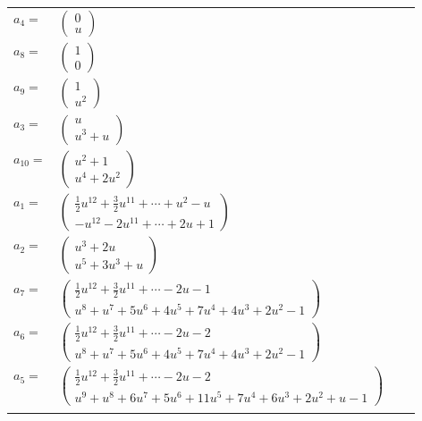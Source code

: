 \documentclass[1p]{elsarticle_modified}
\theoremstyle{definition}
\begin{document}
\begin{tabular}{m{7pt} m{180pt} m{7pt} m{180pt} }
\flushright $a_{4}=$&$\begin{pmatrix}0\\u\end{pmatrix}$ \\
\flushright $a_{8}=$&$\begin{pmatrix}1\\0\end{pmatrix}$ \\
\flushright $a_{9}=$&$\begin{pmatrix}1\\u^2\end{pmatrix}$ \\
\flushright $a_{3}=$&$\begin{pmatrix}u\\u^3+u\end{pmatrix}$ \\
\flushright $a_{10}=$&$\begin{pmatrix}u^2+1\\u^4+2 u^2\end{pmatrix}$ \\
\flushright $a_{1}=$&$\begin{pmatrix}\frac{1}{2} u^{12}+\frac{3}{2} u^{11}+\cdots+u^2- u\\- u^{12}-2 u^{11}+\cdots+2 u+1\end{pmatrix}$ \\
\flushright $a_{2}=$&$\begin{pmatrix}u^3+2 u\\u^5+3 u^3+u\end{pmatrix}$ \\
\flushright $a_{7}=$&$\begin{pmatrix}\frac{1}{2} u^{12}+\frac{3}{2} u^{11}+\cdots-2 u-1\\u^8+u^7+5 u^6+4 u^5+7 u^4+4 u^3+2 u^2-1\end{pmatrix}$ \\
\flushright $a_{6}=$&$\begin{pmatrix}\frac{1}{2} u^{12}+\frac{3}{2} u^{11}+\cdots-2 u-2\\u^8+u^7+5 u^6+4 u^5+7 u^4+4 u^3+2 u^2-1\end{pmatrix}$ \\
\flushright $a_{5}=$&$\begin{pmatrix}\frac{1}{2} u^{12}+\frac{3}{2} u^{11}+\cdots-2 u-2\\u^9+u^8+6 u^7+5 u^6+11 u^5+7 u^4+6 u^3+2 u^2+u-1\end{pmatrix}$\\&\end{tabular}
\end{document}
